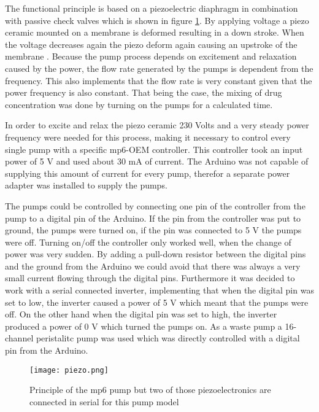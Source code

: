 The functional principle is based on a piezoelectric diaphragm in combination with passive check valves which is shown in figure \ref{figure:piezo}. By applying voltage a piezo ceramic mounted on a membrane is deformed resulting in a down stroke. When the voltage decreases again the piezo deform again causing an upstroke of the membrane \cite{piezo_pumps}. Because the pump process depends on excitement and relaxation caused by the power, the flow rate generated by the pumps is dependent from the frequency. This also implements that the flow rate is very constant given that the power frequency is also constant. That being the case, the mixing of drug concentration was done by turning on the pumps for a calculated time.

In order to excite and relax the piezo ceramic 230 Volts and a very steady power frequency were needed for this process, making it necessary to control every single pump with a specific mp6-OEM controller. This controller took an input power of 5 V and used about 30 mA of current. The Arduino was not capable of supplying this amount of current for every pump, therefor a separate power adapter was installed to supply the pumps. 

The pumps could be controlled by connecting one pin of the controller from the pump to a digital pin of the Arduino. 
If the pin from the controller was put to ground, the pumps were turned on, if the pin was connected to 5 V the pumps were off. Turning on/off the controller only worked well, when the change of power was very sudden. 
By adding a pull-down resistor between the digital pins and the ground from the Arduino we could avoid that there was always a very small current flowing through the digital pins. Furthermore it was decided to work with a serial connected inverter, implementing that when the digital pin was set to low, the inverter caused a power of 5 V which meant that the pumps were off. On the other hand when the digital pin was set to high, the inverter produced a power of 0 V which turned the pumps on.  
As a waste pump a 16-channel peristalitc pump was used which was directly controlled with a digital pin from the Arduino. 
\label{section:pumps}
\begin{figure}
	\texttt{[image: piezo.png]}
	\caption{Principle of the mp6 pump but two of those piezoelectronics are connected in serial for this pump model \cite{piezo_pumps}}
	\label{figure:piezo}
\end{figure}

